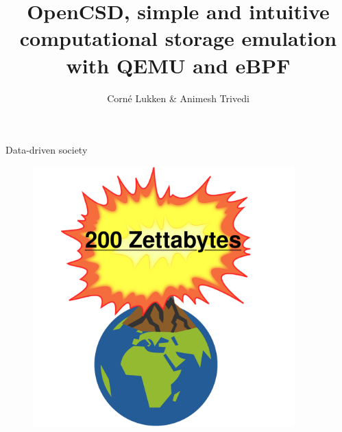 \documentclass{beamer}
\author{Corné Lukken \& Animesh Trivedi}
\title{OpenCSD, simple and intuitive computational storage emulation with QEMU and eBPF}
\begin{document}

\frame{\titlepage}
\begin{frame}{Data-driven society}
	\begingroup
	\small
	\begin{figure}
		\centering
		\includegraphics[width=0.9\textwidth]{resources/images/data-problem.png}
	\end{figure}
	\endgroup
\end{frame}
\end{document}
